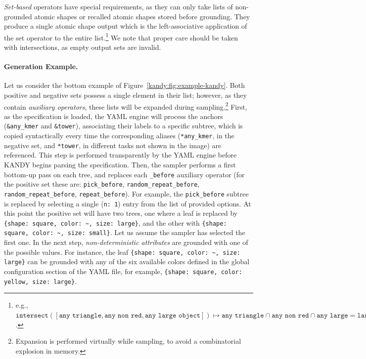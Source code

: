 %
\textit{Set-based} operators have special requirements, as they can only take lists of non-grounded atomic shapes or recalled atomic shapes stored before grounding. They produce a single atomic shape output which is the left-associative application of the set operator to the entire list.\footnote{e.g., $\texttt{intersect}([\texttt{any triangle}, \texttt{any non red}, \texttt{any large object}]) \mapsto \texttt{any triangle} \cap \texttt{any non red} \cap \texttt{any large} = \texttt{large non red triangle}$.} We note that proper care should be taken with intersections, as empty output sets are invalid.

\paragraph{Generation Example.} Let us consider the bottom example of Figure~\ref{kandy:fig:example-kandy}.
Both positive and negative sets possess a single element in their list; however, as they contain \textit{auxiliary operators}, these lists will be expanded during sampling.\footnote{Expansion is performed virtually while sampling, to avoid a combinatorial explosion in memory.}
%
First, as the specification is loaded, the YAML engine will process the anchors (\texttt{\&any\_kmer} and  \texttt{\&tower}), associating their labels to a specific subtree, which is copied syntactically every time the corresponding aliases (\texttt{*any\_kmer}, in the negative set, and \texttt{*tower}, in different tasks not shown in the image) are referenced. This step is performed transparently by the YAML engine before \textsc{KANDY} begins parsing the specification.
%
Then, the sampler performs a first bottom-up pass on each tree, and replaces each \texttt{\_before} auxiliary operator (for the positive set these are: \texttt{pick\_before}, \texttt{random\_repeat\_before}, \texttt{random\_repeat\_before}, \texttt{repeat\_before}). For example, the \texttt{pick\_before} subtree is replaced by selecting a single (\texttt{n: 1}) entry from the list of  provided options.
At this point the positive set will have two trees, one where a leaf is replaced by \texttt{\{shape: square, color: \textasciitilde, size: large\}}, and the other with \texttt{\{shape: square, color: \textasciitilde, size: small\}}. Let us  assume the sampler has selected the first one.
%
In the next step, \textit{non-deterministic attributes} are grounded with one of the possible values. For instance, the leaf \texttt{\{shape: square, color: \textasciitilde, size: large\}} can be grounded with any of the six available colors defined in the global configuration section of the YAML file, for  example, \texttt{\{shape: square, color: yellow, size: large\}}.
